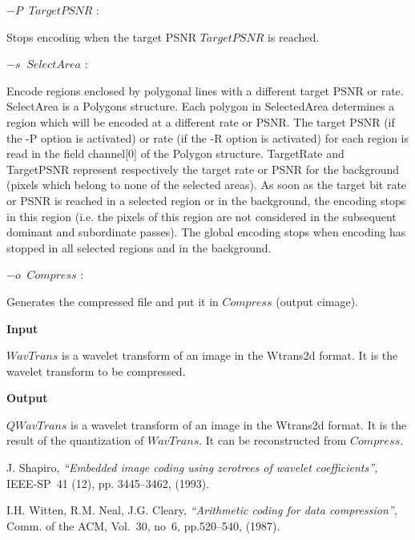 $-P \;\; TargetPSNR$ : \parbox[t]{13.3cm}{Stops encoding when the target PSNR 
$TargetPSNR$ is reached. } 
\newline 

$-s \;\; SelectArea$ : \parbox[t]{13.3cm}{Encode regions enclosed 
by polygonal lines with a different target PSNR or rate. 
SelectArea is a Polygons structure. Each polygon in SelectedArea 
determines a region which will be encoded at a different rate or PSNR. 
The target PSNR (if the -P option is activated) or rate (if the -R option 
is activated) for each region is read in the field channel[0] 
of the Polygon structure. TargetRate and TargetPSNR represent respectively 
the target rate or PSNR for the background (pixels which belong to none 
of the selected areas).  As soon as the target bit rate or PSNR is reached 
in a selected region or in the background, the encoding stops in this 
region (i.e. the pixels of this region are not considered in the subsequent 
dominant and subordinate passes). The global encoding stops when encoding 
has stopped in all selected regions and in the background. } 
\newline 

$-o \;\; Compress$ : \parbox[t]{13.3cm}{Generates the compressed file 
and put it in $Compress$ (output cimage). } 
\newline 

{\bf Input} 
\newline 

$WavTrans$ is a wavelet transform of an image in the Wtrans2d format. 
It is the wavelet transform to be compressed.
\newline 

{\bf Output} 
\newline \nopagebreak

$QWavTrans$ is a wavelet transform of an image in the Wtrans2d format. 
It is the result of the quantization of $WavTrans$. It can be reconstructed 
from $Compress$. 





\begin{thebibliography}{999999}

 J. Shapiro, {\em ``Embedded image coding using zerotrees 
of wavelet coefficients'', } IEEE-SP~41 (12), pp. 3445--3462, (1993).  

 I.H. Witten, R.M. Neal, J.G. Cleary, {\em ``Arithmetic 
coding for data compression'', } Comm. of the ACM, Vol.~30, no~6, pp.520--540, 
(1987). 

\end{thebibliography}
